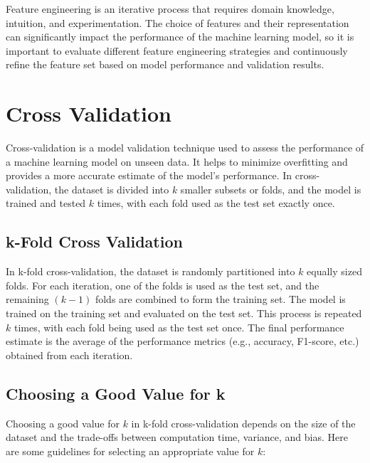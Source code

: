 \documentclass[12pt]{article}
\begin{document}
Feature engineering is an iterative process that requires domain knowledge, intuition, and experimentation. The choice of features and their representation can significantly impact the performance of the machine learning model, so it is important to evaluate different feature engineering strategies and continuously refine the feature set based on model performance and validation results.
\section{Cross Validation}

Cross-validation is a model validation technique used to assess the performance of a machine learning model on unseen data. It helps to minimize overfitting and provides a more accurate estimate of the model's performance. In cross-validation, the dataset is divided into $k$ smaller subsets or folds, and the model is trained and tested $k$ times, with each fold used as the test set exactly once.

\subsection{k-Fold Cross Validation}

In k-fold cross-validation, the dataset is randomly partitioned into $k$ equally sized folds. For each iteration, one of the folds is used as the test set, and the remaining $(k-1)$ folds are combined to form the training set. The model is trained on the training set and evaluated on the test set. This process is repeated $k$ times, with each fold being used as the test set once. The final performance estimate is the average of the performance metrics (e.g., accuracy, F1-score, etc.) obtained from each iteration.

\subsection{Choosing a Good Value for k}

Choosing a good value for $k$ in k-fold cross-validation depends on the size of the dataset and the trade-offs between computation time, variance, and bias. Here are some guidelines for selecting an appropriate value for $k$:
\end{document}
